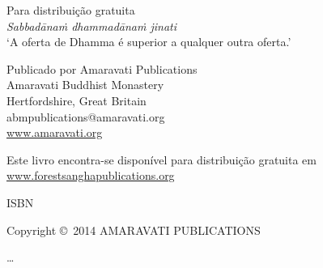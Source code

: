 \cleartoverso

\thispagestyle{empty}

{\small\setlength{\parskip}{0.8em}\setlength{\parindent}{0em}%
{\raggedright%

\thetitle

Para distribuição gratuita\\
\textit{Sabbadānaṁ dhammadānaṁ jinati}\\
‘A oferta de Dhamma é superior a qualquer outra oferta.’

Publicado por Amaravati Publications\\
Amaravati Buddhist Monastery\\
Hertfordshire, Great Britain\\
abmpublications@amaravati.org\\
\href{http://amaravati.org}{www.amaravati.org}

Este livro encontra-se disponível para distribuição gratuita em\\
\href{http://forestsanghapublications.org/}{www.forestsanghapublications.org}

ISBN \theISBN

Copyright \copyright\ 2014 AMARAVATI PUBLICATIONS

\ldots

%
%
%
%

}}

